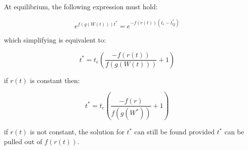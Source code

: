 \documentclass[11pt]{article}
\begin{document}
At equilibrium, the following expression must hold:

\begin{equation*}
e^{f(g(W(t))) t^{*}} = e^{-f(r(t))(t_{e} - t_{Q}^{*})}
\end{equation*}

which simplifying is equivalent to:

\begin{equation*}
t^{*} = t_{e}\left( \frac{-f(r(t))}{f(g(W(t)))} + 1 \right)
\end{equation*}

if \(r(t)\) is constant then:

\begin{equation*}
t^{*} = t_{e}\left( \frac{-f(r)}{f(g(W^{*}))} + 1 \right)
\end{equation*}

if \(r(t)\) is not constant, the solution for \(t^{*}\) can still be found provided \(t^{*}\) can be pulled out of \(f(r(t))\).
\end{document}
